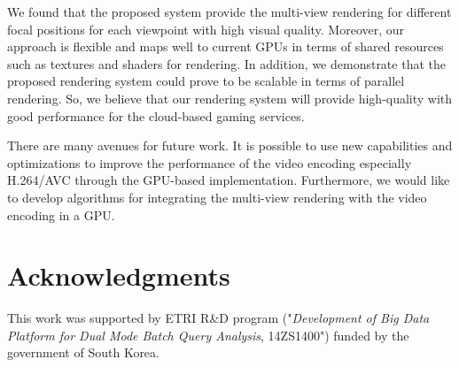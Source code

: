 \documentclass{sig-alternate}
\begin{document}
    We found that the proposed system provide the multi-view rendering for different focal positions for each viewpoint with high visual quality.
    Moreover, our approach is flexible and maps well to current GPUs in terms of shared resources such as textures and shaders for rendering.
    In addition, we demonstrate that the proposed rendering system could prove to be scalable in terms of parallel rendering. So, we believe that our rendering system will provide high-quality with good performance for the cloud-based gaming services.

    There are many avenues for future work. It is possible to use new capabilities and optimizations to improve the performance of the video encoding especially H.264/AVC through the GPU-based implementation.
    Furthermore, we would like to develop algorithms for integrating the multi-view rendering with the video encoding in a GPU.


\section{Acknowledgments}
This work was supported by ETRI R\&D program ("\textit{Development of Big Data Platform for Dual Mode Batch Query Analysis}, 14ZS1400")
funded by the government of South Korea.

%

\end{document}
